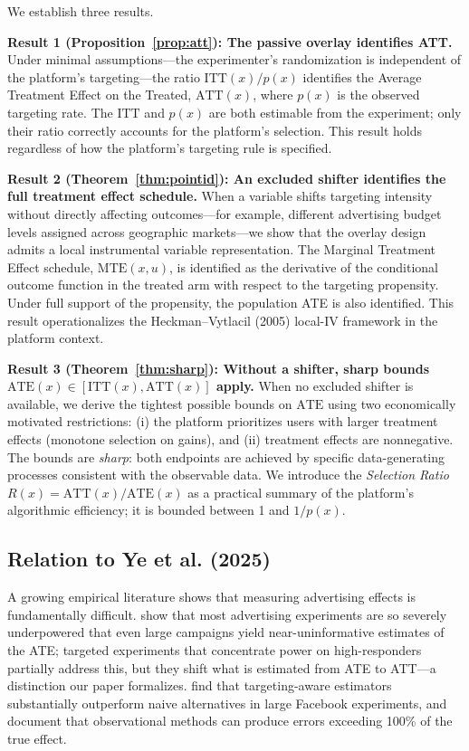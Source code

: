 \documentclass[12pt]{article}
\newcommand{\ATT}{\mathrm{ATT}}
\newcommand{\ATE}{\mathrm{ATE}}
\newcommand{\ITT}{\mathrm{ITT}}
\newcommand{\MTE}{\mathrm{MTE}}
\begin{document}
We establish three results.

\textbf{Result 1 (Proposition~\ref{prop:att}): The passive overlay identifies
ATT.} Under minimal assumptions---the experimenter's randomization is
independent of the platform's targeting---the ratio $\ITT(x)/p(x)$
identifies the Average Treatment Effect on the Treated, $\ATT(x)$, where
$p(x)$ is the observed targeting rate. The $\ITT$ and $p(x)$ are both
estimable from the experiment; only their ratio correctly accounts for the
platform's selection. This result holds regardless of how the platform's
targeting rule is specified.

\textbf{Result 2 (Theorem~\ref{thm:pointid}): An excluded shifter identifies
the full treatment effect schedule.} When a variable shifts targeting
intensity without directly affecting outcomes---for example, different
advertising budget levels assigned across geographic markets---we show that
the overlay design admits a local instrumental variable representation. The
Marginal Treatment Effect schedule, $\MTE(x,u)$, is identified as the
derivative of the conditional outcome function in the treated arm with
respect to the targeting propensity. Under full support of the propensity,
the population ATE is also identified. This result operationalizes the
Heckman--Vytlacil (2005) local-IV framework in the platform context.

\textbf{Result 3 (Theorem~\ref{thm:sharp}): Without a shifter, sharp bounds
$\ATE(x) \in [\ITT(x), \ATT(x)]$ apply.} When no excluded shifter is
available, we derive the tightest possible bounds on $\ATE$ using two
economically motivated restrictions: (i) the platform prioritizes users
with larger treatment effects (monotone selection on gains), and (ii)
treatment effects are nonnegative. The bounds are \emph{sharp}: both
endpoints are achieved by specific data-generating processes consistent with
the observable data. We introduce the \emph{Selection Ratio}
$R(x) = \ATT(x)/\ATE(x)$ as a practical summary of the platform's
algorithmic efficiency; it is bounded between 1 and $1/p(x)$.

\subsection*{Relation to Ye et al. (2025)}

A growing empirical literature shows that measuring advertising effects
is fundamentally difficult. \citet{lewis2015unfavorable} show that most
advertising experiments are so severely underpowered that even large campaigns
yield near-uninformative estimates of the ATE; targeted experiments that
concentrate power on high-responders partially address this, but they shift
what is estimated from ATE to ATT---a distinction our paper formalizes.
\citet{gordon2019comparison} find that targeting-aware estimators
substantially outperform naive alternatives in large Facebook experiments,
and \citet{gordon2023close} document that observational methods can produce
errors exceeding 100\% of the true effect.
\end{document}
